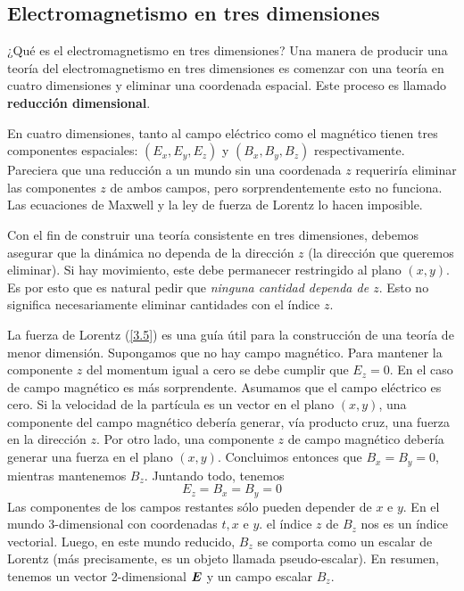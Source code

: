 \subsection{Electromagnetismo en tres dimensiones}\label{sec:3.2}
¿Qué es el electromagnetismo en tres dimensiones? Una manera de producir una teoría del electromagnetismo en tres dimensiones es comenzar con una teoría en cuatro dimensiones y eliminar una coordenada espacial. Este proceso es llamado \textbf{reducción dimensional}.

En cuatro dimensiones, tanto al campo eléctrico como el magnético tienen tres componentes espaciales: $(E_x,E_y,E_z)$ y $(B_x,B_y,B_z)$ respectivamente. Pareciera que una reducción a un mundo sin una coordenada $z$ requeriría eliminar las componentes $z$ de ambos campos, pero sorprendentemente esto no funciona. Las ecuaciones de Maxwell y la ley de fuerza de Lorentz lo hacen imposible.

Con el fin de construir una teoría consistente en tres dimensiones, debemos asegurar que la dinámica no dependa de la dirección $z$ (la dirección que queremos eliminar). Si hay movimiento, este debe permanecer restringido al plano $(x,y)$. Es por esto que es natural pedir que \textit{ninguna cantidad dependa de $z$}. Esto no significa necesariamente eliminar cantidades con el índice $z$.

La fuerza de Lorentz (\ref{3.5}) es una guía útil para la construcción de una teoría de menor dimensión. Supongamos que no hay campo magnético. Para mantener la componente $z$ del momentum igual a cero se debe cumplir que $E_z=0$. En el caso de campo magnético es más sorprendente. Asumamos que el campo eléctrico es cero. Si la velocidad de la partícula es un vector en el plano $(x,y)$, una componente del campo magnético debería generar, vía producto cruz, una fuerza en la dirección $z$. Por otro lado, una componente $z$ de campo magnético debería generar una fuerza en el plano $(x,y)$. Concluimos entonces que $B_x=B_y=0$, mientras mantenemos $B_z$. Juntando todo, tenemos
\begin{equation}
    E_z=B_x=B_y=0
\end{equation}
Las componentes de los campos restantes sólo pueden depender de $x$ e $y$. En el mundo 3-dimensional con coordenadas $t,x$ e $y$. el índice $z$ de $B_z$ nos es un índice vectorial. Luego, en este mundo reducido, $B_z$ se comporta como un escalar de Lorentz (más precisamente, es un objeto llamada pseudo-escalar). En resumen, tenemos un vector 2-dimensional $\vb*{E}$ y un campo escalar $B_z$.

